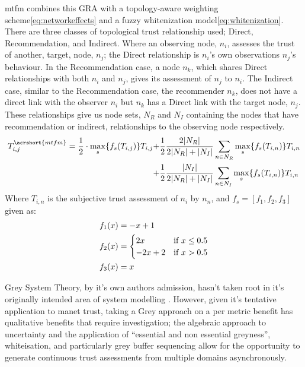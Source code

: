 \acrshort{mtfm} combines this GRA with a topology-aware weighting scheme\eqref{eq:networkeffects} and a fuzzy whitenization model\eqref{eq:whitenization}.
There are three classes of topological trust relationship used; Direct, Recommendation, and Indirect.
Where an observing node, $n_i$, assesses the trust of another, target, node, $n_j$; the Direct relationship is $n_i$'s own observations $n_j$'s behaviour.
In the Recommendation case, a node $n_k$, which shares Direct relationships with both $n_i$ and $n_j$, gives its assessment of $n_j$ to $n_i$.
The Indirect case, similar to the Recommendation case, the recommender $n_k$, does not have a direct link with the observer $n_i$ but $n_k$ has a Direct link with the target node, $n_j$.
These relationships give us node sets, $N_R$ and $N_I$ containing the nodes that have recommendation or indirect, relationships to the observing node respectively.
%
\begin{align}
  T_{i,j}^{\acrshort{mtfm}}=\frac{1}{2} \cdot \max_s\{f_s(T_{i,j})\} T_{i,j}+&\frac{1}{2} \frac{2|N_R| }{2|N_R| + |N_I|}\sum_{n \in N_R} \max_s\{f_s(T_{i,n})\} T_{i,n}\\ \notag
  +&\frac{1}{2} \frac{|N_I| }{2|N_R| + |N_I|}\sum_{n \in N_I} \max_s\{f_s(T_{i,n})\} T_{i,n} 
\end{align}
Where $T_{i,n}$ is the subjective trust assessment of $n_i$ by $n_n$, and $f_s = [ f_1,f_2, f_3]$ given as:
\begin{align}
  f_1(x)&= -x+1\notag\\
  f_2(x)&= 
  \begin{cases}
    2x & \text{if }x\leq 0.5\\
    -2x+2 & \text{if }x>0.5
  \end{cases}\\
  f_3(x)&= x\notag
\end{align}

Grey System Theory, by it's own authors admission, hasn't taken root in it's originally intended area of system modelling \cite{Liu2011}.
However, given it's tentative application to \gls{manet} trust, taking a Grey approach on a per metric benefit has qualitative benefits that require investigation; the algebraic approach to uncertainty and the application of ``essential and non essential greyness'', whiteisation, and particularly grey buffer sequencing allow for the opportunity to generate continuous trust assessments from multiple domains asynchronously.


